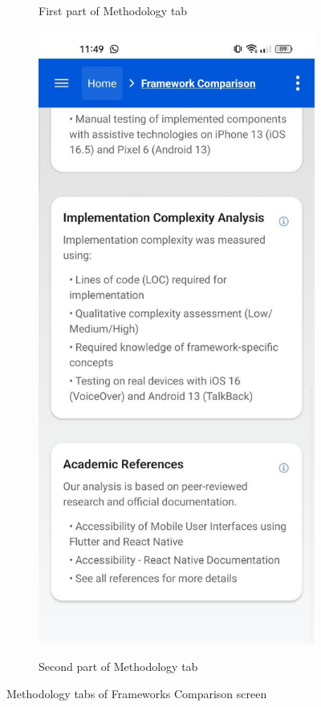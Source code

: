 \begin{figure}[ht]
\begin{subfigure}[b]{0.48\textwidth}
        \caption{First part of Methodology tab}
        \label{fig:methodology-1}
    \end{subfigure}
    \hfill
    \begin{subfigure}[b]{0.48\textwidth}
        \centering
        \includegraphics[width=\linewidth, alt={Framework Comparison Screen with Flutter selected}]{img/methodology2.jpg}
        \caption{Second part of Methodology tab}
        \label{fig:methodology-2}
    \end{subfigure}
    \caption{Methodology tabs of Frameworks Comparison screen}
    \label{fig:methodology_screens_sidebyside}
\end{figure}

